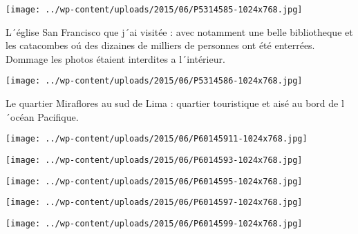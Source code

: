  

 

\begin{center} \texttt{[image: ../wp-content/uploads/2015/06/P5314585-1024x768.jpg]} \end{center}

 

 L´église San Francisco que j´ai visitée : avec notamment une belle bibliotheque et les catacombes oú des dizaines de milliers de personnes ont été enterrées. Dommage les photos étaient interdites a l´intérieur. 

 

\begin{center} \texttt{[image: ../wp-content/uploads/2015/06/P5314586-1024x768.jpg]} \end{center}

 

 Le quartier Miraflores au sud de Lima : quartier touristique et aisé au bord de l´océan Pacifique. 

 

\begin{center} \texttt{[image: ../wp-content/uploads/2015/06/P60145911-1024x768.jpg]} \end{center}

 

 

\begin{center} \texttt{[image: ../wp-content/uploads/2015/06/P6014593-1024x768.jpg]} \end{center}

 

 

\begin{center} \texttt{[image: ../wp-content/uploads/2015/06/P6014595-1024x768.jpg]} \end{center}

 

 

\begin{center} \texttt{[image: ../wp-content/uploads/2015/06/P6014597-1024x768.jpg]} \end{center}

 

 

\begin{center} \texttt{[image: ../wp-content/uploads/2015/06/P6014599-1024x768.jpg]} \end{center}


